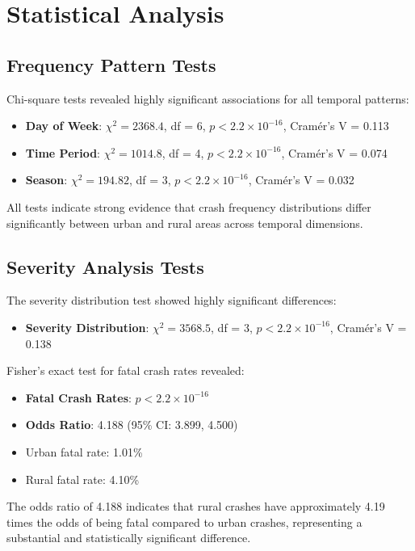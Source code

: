 \documentclass[12pt,a4paper]{article}
\begin{document}
\section{Statistical Analysis}

\subsection{Frequency Pattern Tests}

Chi-square tests revealed highly significant associations for all temporal patterns:

\begin{itemize}
    \item \textbf{Day of Week}: $\chi^2 = 2368.4$, df = 6, $p < 2.2 \times 10^{-16}$, Cramér's V = 0.113
    \item \textbf{Time Period}: $\chi^2 = 1014.8$, df = 4, $p < 2.2 \times 10^{-16}$, Cramér's V = 0.074
    \item \textbf{Season}: $\chi^2 = 194.82$, df = 3, $p < 2.2 \times 10^{-16}$, Cramér's V = 0.032
\end{itemize}

All tests indicate strong evidence that crash frequency distributions differ significantly between urban and rural areas across temporal dimensions.

\subsection{Severity Analysis Tests}

The severity distribution test showed highly significant differences:
\begin{itemize}
    \item \textbf{Severity Distribution}: $\chi^2 = 3568.5$, df = 3, $p < 2.2 \times 10^{-16}$, Cramér's V = 0.138
\end{itemize}

Fisher's exact test for fatal crash rates revealed:
\begin{itemize}
    \item \textbf{Fatal Crash Rates}: $p < 2.2 \times 10^{-16}$
    \item \textbf{Odds Ratio}: 4.188 (95\% CI: 3.899, 4.500)
    \item Urban fatal rate: 1.01\%
    \item Rural fatal rate: 4.10\%
\end{itemize}

The odds ratio of 4.188 indicates that rural crashes have approximately 4.19 times the odds of being fatal compared to urban crashes, representing a substantial and statistically significant difference.
\end{document}
